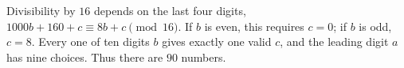 Divisibility by $16$ depends on the last four digits, $1000b+160+c\equiv8b+c\pmod{16}$. If $b$ is even, this requires $c=0$; if $b$ is odd, $c=8$. Every one of ten digits $b$ gives exactly one valid $c$, and the leading digit $a$ has nine choices. Thus there are $\boxed{90}$ numbers.
